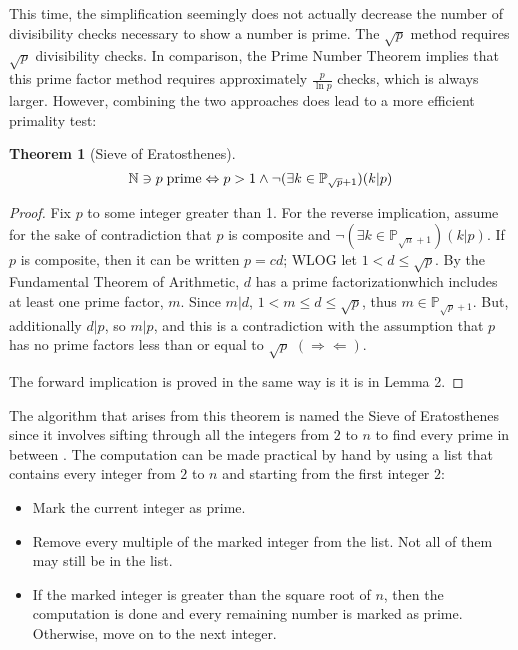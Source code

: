 \documentclass[10pt, oneside]{article}
\let\leq\leqslant
\newcommand{\N}{\mathbb{N}}
\renewcommand{\P}{\mathbb{P}} %
\newcommand{\contra}{(\Rightarrow\Leftarrow)}
\newtheorem{thm}{Theorem}
\begin{document}
This time, the simplification seemingly does not actually decrease the number of divisibility checks necessary to show a number is prime. The $\sqrt{p}$ method requires $\sqrt{p}$ divisibility checks. In comparison, the Prime Number Theorem \cite{PNT} implies that this prime factor method requires approximately $\frac{p}{\ln p}$  checks, which is always larger. However, combining the two approaches does lead to a more efficient primality test:

\begin{thm}[Sieve of Eratosthenes]
    \[\N \ni p {\rm\;prime} \Leftrightarrow p > 1 \land \lnot(\exists k \in \P_{\sqrt{p} + 1})(k|p)\]
\end{thm}
\begin{proof}
    Fix $p$ to some integer greater than 1. For the reverse implication, assume for the sake of contradiction that $p$ is composite and $\lnot(\exists k \in \P_{\sqrt{n} + 1})(k|p)$. If $p$ is composite, then it can be written $p = cd$; WLOG let $1 < d \leq \sqrt{p}$. By the Fundamental Theorem of Arithmetic, $d$ has a prime factorizationwhich includes at least one prime factor, $m$. Since $m|d$, $1 < m \leq d \leq \sqrt{p}$, thus $m \in \P_{\sqrt{p} + 1}$. But, additionally $d|p$, so $m|p$, and this is a contradiction with the assumption that $p$ has no prime factors less than or equal to $\sqrt{p}$ $\contra$.
    
    The forward implication is proved in the same way is it is in Lemma 2.
\end{proof}

The algorithm that arises from this theorem is named the Sieve of Eratosthenes since it involves sifting through all the integers from $2$ to $n$ to find every prime in between \cite{sieve}. The computation can be made practical by hand by using a list that contains every integer from $2$ to $n$ and starting from the first integer $2$:
\begin{itemize}
    \item Mark the current integer as prime.
    \item Remove every multiple of the marked integer from the list. Not all of them may still be in the list.
    \item If the marked integer is greater than the square root of $n$, then the computation is done and every remaining number is marked as prime. Otherwise, move on to the next integer.
\end{itemize}
\end{document}
